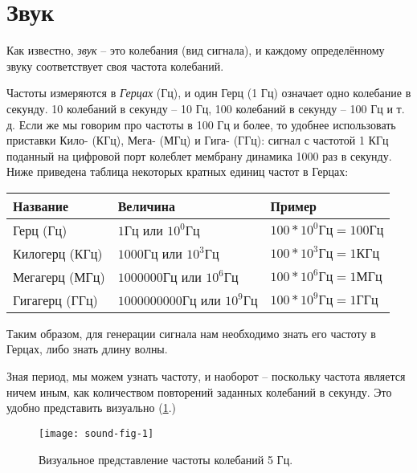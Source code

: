 \documentclass[../sparc.tex]{subfiles}
\begin{document}
\section{Звук}


Как известно, \emph{звук} -- это колебания (вид сигнала), и каждому
определённому звуку соответствует своя частота колебаний.

Частоты измеряются в \emph{Герцах} (\gls{Гц}), и один Герц (1 Гц) означает одно
колебание в секунду. 10 колебаний в секунду -- 10 Гц, 100 колебаний в секунду --
100 Гц и т. д. Если же мы говорим про частоты в 100 Гц и более, то удобнее
использовать приставки Кило- (\gls{КГц}), Мега- (\gls{МГц}) и Гига- (\gls{ГГц}):
сигнал с частотой 1 КГц поданный на цифровой порт колеблет мембрану динамика
1000 раз в секунду.  Ниже приведена таблица некоторых кратных единиц частот в
Герцах:

\begin{tabular}{p{3cm}|p{4cm}|p{3.5cm}}
  Название & Величина & Пример \\
  \hline \hline
  Герц (Гц)
  & $ 1 \mbox{Гц} $ или $ 10^0 \mbox{Гц} $
  & $ 100 * 10^0 \mbox{Гц} = 100 \mbox{Гц} $ \\
  \hline
  Килогерц (КГц)
  & $ 1000 \mbox{Гц} $ или $ 10^3 \mbox{Гц} $
  & $ 100 * 10^3 \mbox{Гц} = 1 \mbox{КГц} $ \\
  \hline
  Мегагерц (МГц)
  & $ 1000000 \mbox{Гц} $ или $ 10^6 \mbox{Гц} $
  & $ 100 * 10^6 \mbox{Гц} = 1 \mbox{МГц} $ \\
  \hline
  Гигагерц (ГГц)
  & $ 1000000000 \mbox{Гц} $ или $ 10^9 \mbox{Гц} $
  & $ 100 * 10^9 \mbox{Гц} = 1 \mbox{ГГц} $ \\
\end{tabular}

Таким образом, для генерации сигнала нам необходимо знать его частоту в Герцах,
либо знать длину волны.

Зная период, мы можем узнать частоту, и наоборот -- поскольку частота является
ничем иным, как количеством повторений заданных колебаний в секунду. Это удобно
представить визуально (\ref{fig:sound-fig-1}.)

\begin{figure}[h]
  \caption{Визуальное представление частоты колебаний 5 Гц.}
  \label{fig:sound-fig-1}
  \texttt{[image: sound-fig-1]}
  \centering
\end{figure}
\end{document}
